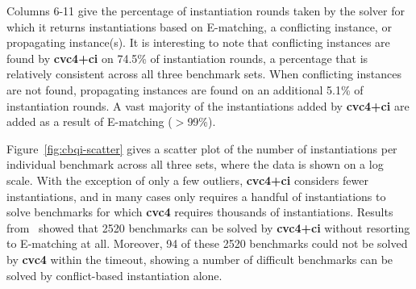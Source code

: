\documentclass[oribibl]{llncs}
\begin{document}
Columns 6-11 give the percentage of instantiation rounds taken by the solver 
for which it returns instantiations based on E-matching, a conflicting instance,
or propagating instance(s).
It is interesting to note that conflicting instances are found by {\bf cvc4+ci} on
74.5\% of instantiation rounds, a percentage that is relatively consistent across all three benchmark sets.
When conflicting instances are not found, propagating instances are found on an additional 5.1\% of instantiation rounds.
A vast majority of the instantiations added by {\bf cvc4+ci} are added as a result of E-matching ($>$99\%).

Figure~\ref{fig:cbqi-scatter} gives a scatter plot of the number of instantiations per individual benchmark
across all three sets, where the data is shown on a log scale.
With the exception of only a few outliers, {\bf cvc4+ci} considers fewer instantiations,
and in many cases only requires a handful of instantiations to solve benchmarks for which {\bf cvc4}
requires thousands of instantiations.
Results from~\cite{ReynoldsTinelliMoura14} showed that 2520 benchmarks can be solved by {\bf cvc4+ci}
without resorting to E-matching at all.
Moreover, 94 of these 2520 benchmarks could not be solved by {\bf cvc4} within the timeout,
showing a number of difficult benchmarks can be solved by conflict-based instantiation alone.
\end{document}
